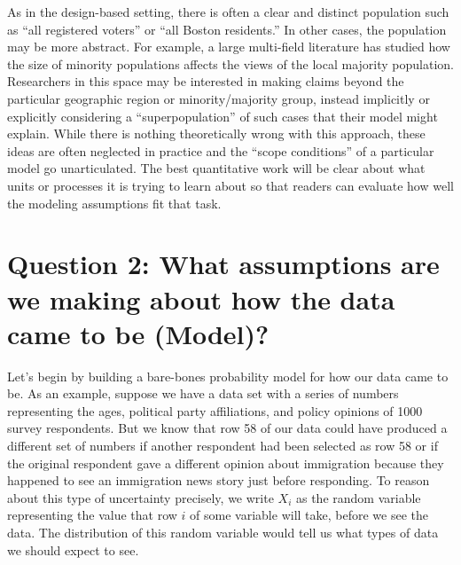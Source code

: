 \documentclass[
  letterpaper,
  DIV=11,
  numbers=noendperiod]{scrreprt}
\theoremstyle{definition}
\theoremstyle{definition}
\theoremstyle{plain}
\theoremstyle{remark}
\begin{document}
As in the design-based setting, there is often a clear and distinct
population such as ``all registered voters'' or ``all Boston
residents.'' In other cases, the population may be more abstract. For
example, a large multi-field literature has studied how the size of
minority populations affects the views of the local majority population.
Researchers in this space may be interested in making claims beyond the
particular geographic region or minority/majority group, instead
implicitly or explicitly considering a ``superpopulation'' of such cases
that their model might explain. While there is nothing theoretically
wrong with this approach, these ideas are often neglected in practice
and the ``scope conditions'' of a particular model go unarticulated. The
best quantitative work will be clear about what units or processes it is
trying to learn about so that readers can evaluate how well the modeling
assumptions fit that task.

\hypertarget{question-2-what-assumptions-are-we-making-about-how-the-data-came-to-be-model}{%
\section{Question 2: What assumptions are we making about how the data
came to be
(Model)?}\label{question-2-what-assumptions-are-we-making-about-how-the-data-came-to-be-model}}

Let's begin by building a bare-bones probability model for how our data
came to be. As an example, suppose we have a data set with a series of
numbers representing the ages, political party affiliations, and policy
opinions of 1000 survey respondents. But we know that row 58 of our data
could have produced a different set of numbers if another respondent had
been selected as row 58 or if the original respondent gave a different
opinion about immigration because they happened to see an immigration
news story just before responding. To reason about this type of
uncertainty precisely, we write \(X_i\) as the random variable
representing the value that row \(i\) of some variable will take, before
we see the data. The distribution of this random variable would tell us
what types of data we should expect to see.
\end{document}
